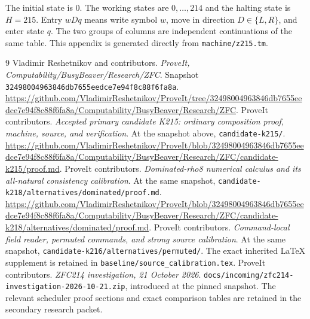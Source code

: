\documentclass[11pt,letterpaper]{article}
\theoremstyle{definition}
\newcommand{\pathfile}[1]{\texttt{\nolinkurl{#1}}}
\begin{document}
The initial state is 0.  The working states are $0,\ldots,214$ and the
halting state is $H=215$.  Entry $wDq$ means write symbol $w$, move in
direction $D\in\{L,R\}$, and enter state $q$.  The two groups of columns
are independent continuations of the same table.  This appendix is
generated directly from \pathfile{machine/z215.tm}.


\begin{thebibliography}{9}
Vladimir Reshetnikov and contributors.
\emph{ProveIt, Computability/BusyBeaver/Research/ZFC}.
Snapshot \pathfile{32498004963846db7655eedce7e94f8c88f6fa8a}.
\url{https://github.com/VladimirReshetnikov/ProveIt/tree/32498004963846db7655eedce7e94f8c88f6fa8a/Computability/BusyBeaver/Research/ZFC}.
ProveIt contributors. \emph{Accepted primary candidate K215: ordinary
composition proof, machine, source, and verification}.
At the snapshot above, \pathfile{candidate-k215/}.
\url{https://github.com/VladimirReshetnikov/ProveIt/blob/32498004963846db7655eedce7e94f8c88f6fa8a/Computability/BusyBeaver/Research/ZFC/candidate-k215/proof.md}.
ProveIt contributors. \emph{Dominated-rho8 numerical calculus and its
all-natural consistency calibration}.
At the same snapshot, \pathfile{candidate-k218/alternatives/dominated/proof.md}.
\url{https://github.com/VladimirReshetnikov/ProveIt/blob/32498004963846db7655eedce7e94f8c88f6fa8a/Computability/BusyBeaver/Research/ZFC/candidate-k218/alternatives/dominated/proof.md}.
ProveIt contributors. \emph{Command-local field reader, permuted
commands, and strong source calibration}.
At the same snapshot, \pathfile{candidate-k216/alternatives/permuted/}.
The exact inherited LaTeX supplement is retained in
\pathfile{baseline/source_calibration.tex}.
ProveIt contributors. \emph{ZFC214 investigation, 21 October 2026}.
\pathfile{docs/incoming/zfc214-investigation-2026-10-21.zip}, introduced
at the pinned snapshot.  The relevant scheduler proof sections and
exact comparison tables are retained in the secondary research packet.
\end{thebibliography}
\end{document}
